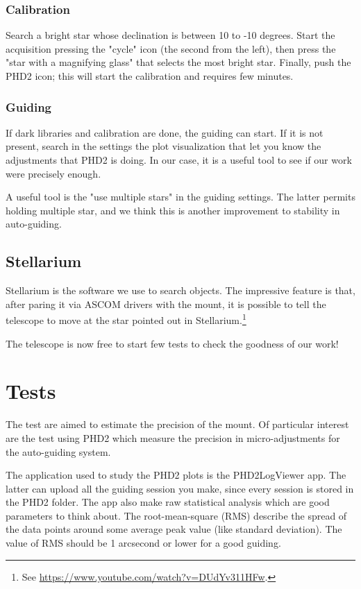\documentclass{article}
\begin{document}
\begin{multicols}{2}
        \subsubsection{Calibration}
        Search a bright star whose declination is between 10 to -10 degrees.
        Start the acquisition pressing the "cycle" icon (the second from the left), then press the "star with a magnifying glass" that selects the most bright star.
        Finally, push the PHD2 icon; this will start the calibration and requires few minutes.

        \subsubsection{Guiding}
        If dark libraries and calibration are done, the guiding can start.
        If it is not present, search in the settings the plot visualization that let you know the adjustments that PHD2 is doing.
        In our case, it is a useful tool to see if our work were precisely enough.        
       
        A useful tool is the "use multiple stars" in the guiding settings.
        The latter permits holding multiple star, and we think this is another improvement to stability in auto-guiding.


        \subsection{Stellarium}
        Stellarium is the software we use to search objects.
        The impressive feature is that, after paring it via ASCOM drivers with the mount, it is possible to tell the telescope to move at the star pointed out in Stellarium.\footnote{See \url{https://www.youtube.com/watch?v=DUdYv311HFw}.}

        The telescope is now free to start few tests to check the goodness of our work!

        \section{Tests}
        \label{sec:tests}
        The test are aimed to estimate the precision of the mount.
        Of particular interest are the test using PHD2 which measure the precision in micro-adjustments for the auto-guiding system.

        The application used to study the PHD2 plots is the PHD2LogViewer app.
        The latter can upload all the guiding session you make, since every session is stored in the PHD2 folder.
        The app also make raw statistical analysis which are good parameters to think about.
        The root-mean-square (RMS) describe the spread of the data points around some average peak value (like standard deviation).
        The value of RMS should be 1 arcsecond or lower for a good guiding.


\end{multicols}
\end{document}
